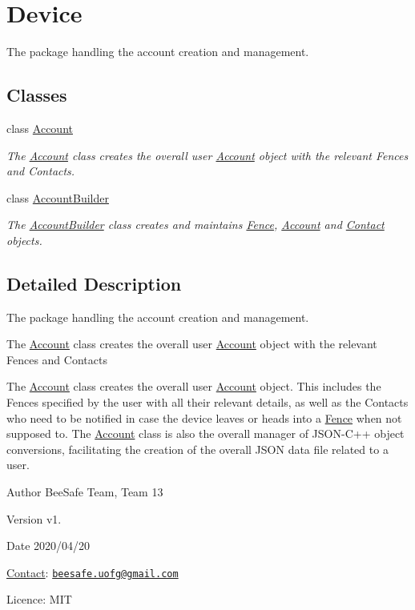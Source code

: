 \hypertarget{group___device}{}\section{Device}
\label{group___device}


The package handling the account creation and management.  


\subsection*{Classes}
\begin{DoxyCompactItemize}
\item 
class \hyperlink{class_account}{Account}
\begin{DoxyCompactList}\small\item\em The \hyperlink{class_account}{Account} class creates the overall user \hyperlink{class_account}{Account} object with the relevant Fences and Contacts. \end{DoxyCompactList}\item 
class \hyperlink{class_account_builder}{Account\+Builder}
\begin{DoxyCompactList}\small\item\em The \hyperlink{class_account_builder}{Account\+Builder} class creates and maintains \hyperlink{class_fence}{Fence}, \hyperlink{class_account}{Account} and \hyperlink{class_contact}{Contact} objects. \end{DoxyCompactList}\end{DoxyCompactItemize}


\subsection{Detailed Description}
The package handling the account creation and management. 

The \hyperlink{class_account}{Account} class creates the overall user \hyperlink{class_account}{Account} object with the relevant Fences and Contacts

The \hyperlink{class_account}{Account} class creates the overall user \hyperlink{class_account}{Account} object. This includes the Fences specified by the user with all their relevant details, as well as the Contacts who need to be notified in case the device leaves or heads into a \hyperlink{class_fence}{Fence} when not supposed to. The \hyperlink{class_account}{Account} class is also the overall manager of J\+S\+O\+N-\/\+C++ object conversions, facilitating the creation of the overall J\+S\+ON data file related to a user.

\begin{DoxyAuthor}{Author}
Bee\+Safe Team, Team 13
\end{DoxyAuthor}
\begin{DoxyVersion}{Version}
v1.
\end{DoxyVersion}
\begin{DoxyDate}{Date}
2020/04/20
\end{DoxyDate}
\hyperlink{class_contact}{Contact}\+: \href{mailto:beesafe.uofg@gmail.com}{\tt beesafe.\+uofg@gmail.\+com}

Licence\+: M\+IT 